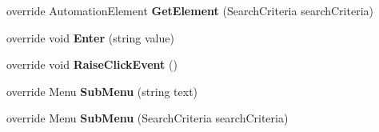 \begin{DoxyCompactItemize}
\item 
\hypertarget{class_proto_test_1_1_golem_1_1_white_1_1_elements_1_1_white_menu_a27f00222650fb2993a269c1a14b44b97}{override Automation\-Element {\bfseries Get\-Element} (Search\-Criteria search\-Criteria)}\label{class_proto_test_1_1_golem_1_1_white_1_1_elements_1_1_white_menu_a27f00222650fb2993a269c1a14b44b97}

\item 
\hypertarget{class_proto_test_1_1_golem_1_1_white_1_1_elements_1_1_white_menu_a12561264a940c1752a4ae22a0a154e55}{override void {\bfseries Enter} (string value)}\label{class_proto_test_1_1_golem_1_1_white_1_1_elements_1_1_white_menu_a12561264a940c1752a4ae22a0a154e55}

\item 
\hypertarget{class_proto_test_1_1_golem_1_1_white_1_1_elements_1_1_white_menu_ac201efdd22c7419c6874e5b945d64301}{override void {\bfseries Raise\-Click\-Event} ()}\label{class_proto_test_1_1_golem_1_1_white_1_1_elements_1_1_white_menu_ac201efdd22c7419c6874e5b945d64301}

\item 
\hypertarget{class_proto_test_1_1_golem_1_1_white_1_1_elements_1_1_white_menu_ab22ab6d3e7bc646a9f0cb2363ed004db}{override Menu {\bfseries Sub\-Menu} (string text)}\label{class_proto_test_1_1_golem_1_1_white_1_1_elements_1_1_white_menu_ab22ab6d3e7bc646a9f0cb2363ed004db}

\item 
\hypertarget{class_proto_test_1_1_golem_1_1_white_1_1_elements_1_1_white_menu_a8bd929099b774d80a2dd6ea1dcffe3fc}{override Menu {\bfseries Sub\-Menu} (Search\-Criteria search\-Criteria)}\label{class_proto_test_1_1_golem_1_1_white_1_1_elements_1_1_white_menu_a8bd929099b774d80a2dd6ea1dcffe3fc}

\end{DoxyCompactItemize}
